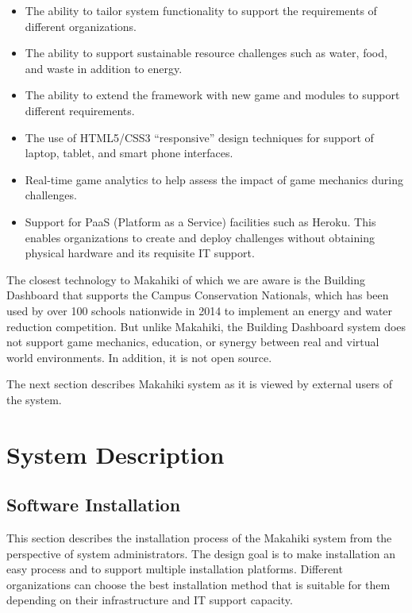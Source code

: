 \begin{itemize}
\item The ability to tailor system functionality to support the requirements of different organizations.
\item The ability to support sustainable resource challenges such as water, food, and waste in addition to energy.
\item The ability to extend the framework with new game and modules to support different requirements.
\item The use of HTML5/CSS3 ``responsive'' design techniques for support of laptop, tablet, and smart phone interfaces.
\item Real-time game analytics to help assess the impact of game mechanics during challenges.
\item Support for PaaS (Platform as a Service) facilities such as Heroku. This enables organizations to create and deploy challenges without obtaining physical hardware and its requisite IT support.
\end{itemize}

The closest technology to Makahiki of which we are aware is the Building Dashboard that supports the Campus Conservation Nationals, which has been used by over 100 schools nationwide in 2014 to implement an energy and water reduction competition. But unlike Makahiki, the Building Dashboard system does not support game mechanics, education, or synergy between real and virtual world environments. In addition, it is not open source.

The next section describes Makahiki system as it is viewed by external users of the system.

\section{System Description}
\label{sec:makahiki-design-description}

\subsection{Software Installation}

This section describes the installation process of the Makahiki system from the perspective of system administrators. The design goal is to make installation an easy process and to support multiple installation platforms. Different organizations can choose the best installation method that is suitable for them depending on their infrastructure and IT support capacity. 

